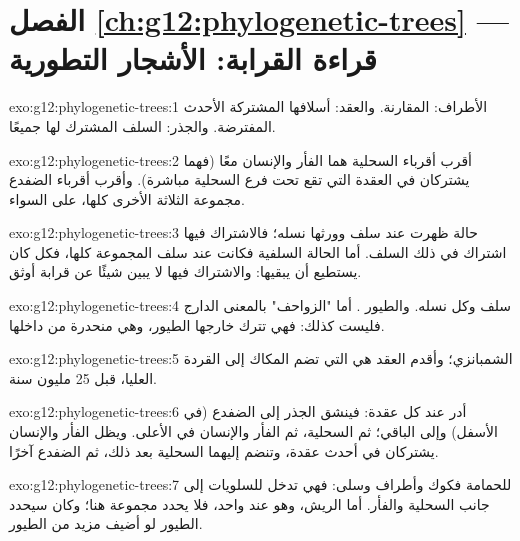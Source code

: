 \section*{الفصل \ref{ch:g12:phylogenetic-trees} --- قراءة القرابة: الأشجار التطورية}

\begin{solution}{exo:g12:phylogenetic-trees:1}
الأطراف:  المقارنة. والعقد: أسلافها المشتركة الأحدث المفترضة.
والجذر: السلف المشترك لها جميعًا.
\end{solution}

\begin{solution}{exo:g12:phylogenetic-trees:2}
أقرب أقرباء السحلية هما الفأر والإنسان معًا (فهما يشتركان في العقدة
التي تقع تحت فرع السحلية مباشرة). وأقرب أقرباء الضفدع مجموعة 
الثلاثة الأخرى كلها، على السواء.
\end{solution}

\begin{solution}{exo:g12:phylogenetic-trees:3}
حالة ظهرت عند سلف وورثها نسله؛ فالاشتراك فيها اشتراك في ذلك السلف. أما
الحالة السلفية فكانت عند سلف المجموعة كلها، فكل  كان يستطيع أن
يبقيها: والاشتراك فيها لا يبين شيئًا عن قرابة أوثق.
\end{solution}

\begin{solution}{exo:g12:phylogenetic-trees:4}
سلف وكل نسله. والطيور . أما "الزواحف" بالمعنى الدارج فليست
كذلك: فهي تترك خارجها الطيور، وهي منحدرة من داخلها.
\end{solution}

\begin{solution}{exo:g12:phylogenetic-trees:5}
الشمبانزي؛ وأقدم العقد هي التي تضم المكاك إلى القردة العليا، قبل 25
مليون سنة.
\end{solution}

\begin{solution}{exo:g12:phylogenetic-trees:6}
أدر عند كل عقدة: فينشق الجذر إلى الضفدع (في الأسفل) وإلى الباقي؛ ثم
السحلية، ثم الفأر والإنسان في الأعلى. ويظل الفأر والإنسان يشتركان في
أحدث عقدة، وتنضم إليهما السحلية بعد ذلك، ثم الضفدع آخرًا.
\end{solution}

\begin{solution}{exo:g12:phylogenetic-trees:7}
للحمامة فكوك وأطراف وسلى: فهي تدخل  للسلويات إلى جانب
السحلية والفأر. أما الريش، وهو عند  واحد، فلا يحدد مجموعة هنا؛ وكان
سيحدد الطيور لو أضيف مزيد من الطيور.
\end{solution}

